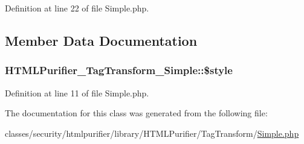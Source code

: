Definition at line 22 of file Simple.\+php.



\subsection{Member Data Documentation}
\hypertarget{classHTMLPurifier__TagTransform__Simple_ae78b6f004ece32e96cd7bedbe5f02e5c}{
\subsubsection[{\$style}]{\setlength{\rightskip}{0pt plus 5cm}H\+T\+M\+L\+Purifier\+\_\+\+Tag\+Transform\+\_\+\+Simple\+::\$style\hspace{0.3cm}{\ttfamily [protected]}}}\label{classHTMLPurifier__TagTransform__Simple_ae78b6f004ece32e96cd7bedbe5f02e5c}


Definition at line 11 of file Simple.\+php.



The documentation for this class was generated from the following file\+:\begin{DoxyCompactItemize}
\item 
classes/security/htmlpurifier/library/\+H\+T\+M\+L\+Purifier/\+Tag\+Transform/\hyperlink{Simple_8php}{Simple.\+php}\end{DoxyCompactItemize}
